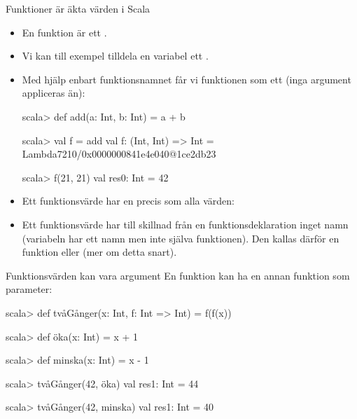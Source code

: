 
\begin{Slide}{Funktioner är äkta värden i Scala}\SlideFontSmall
\begin{itemize}
\item En funktion är ett .
\item Vi kan till exempel tilldela en variabel ett .
\pause
\item Med hjälp enbart funktionsnamnet får vi funktionen som ett  (inga argument appliceras än):
\begin{REPLnonum}
scala> def add(a: Int, b: Int) = a + b

scala> val f = add  
val f: (Int, Int) => Int = Lambda7210/0x0000000841e4e040@1ce2db23

scala> f(21, 21)
val res0: Int = 42
\end{REPLnonum}
\item Ett funktionsvärde har en  precis som alla värden: \\
\pause
\item Ett funktionsvärde har till skillnad från en funktionsdeklaration inget namn (variabeln  har ett namn men inte själva funktionen). Den kallas därför en  funktion eller  (mer om detta snart).
\end{itemize}
\end{Slide}

\begin{Slide}{Funktionsvärden kan vara argument}
En funktion kan ha en annan funktion som parameter:
\begin{REPL}
scala> def tvåGånger(x: Int, f: Int => Int) = f(f(x))

scala> def öka(x: Int) = x + 1

scala> def minska(x: Int) = x - 1

scala> tvåGånger(42, öka)
val res1: Int = 44

scala> tvåGånger(42, minska)
val res1: Int = 40
\end{REPL}
\end{Slide}



